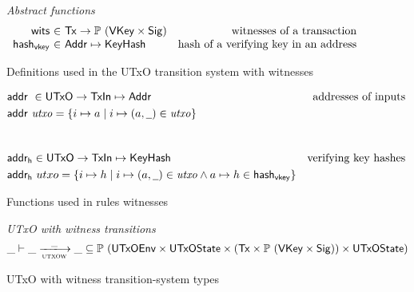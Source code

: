 \begin{figure}[htb]
  \emph{Abstract functions}
  \begin{equation*}
    \begin{array}{r@{~\in~}lr}
      \fun{wits} & \Tx \to \powerset{(\VKey \times \Sig)}
      & \text{witnesses of a transaction}\\
      \fun{hash_{vkey}} & \Addr \mapsto \KeyHash
      & \text{hash of a verifying key in an address}\\
    \end{array}
  \end{equation*}
  \caption{Definitions used in the UTxO transition system with witnesses}
  \label{fig:defs:utxow}
\end{figure}
\begin{figure}[htb]
  \begin{align*}
    & \addr{}{} \in \UTxO \to \TxIn \mapsto \Addr & \text{addresses of inputs}\\
    & \addr{utxo} = \{ i \mapsto a \mid i \mapsto (a, \wcard) \in \var{utxo} \} \\
    \nextdef
    & \fun{addr_h} \in \UTxO \to \TxIn \mapsto \KeyHash & \text{verifying key hashes}\\
    & \fun{addr_h}~utxo = \{ i \mapsto h \mid i \mapsto (a, \wcard) \in \var{utxo}
      \wedge a \mapsto h \in \fun{hash_{vkey}} \}
  \end{align*}
  \caption{Functions used in rules witnesses}
  \label{fig:derived-defs:utxow}
\end{figure}

\begin{figure}
  \emph{UTxO with witness transitions}
  \begin{equation*}
    \var{\_} \vdash
    \var{\_} \trans{utxow}{\_} \var{\_}
    \subseteq \powerset
    (\UTxOEnv \times \UTxOState \times (\Tx \times \powerset{(\VKey \times \Sig)}) \times \UTxOState)
  \end{equation*}
  \caption{UTxO with witness transition-system types}
  \label{fig:ts-types:utxow}
\end{figure}


